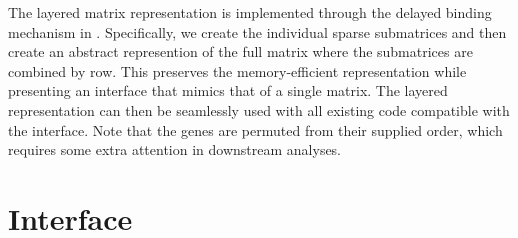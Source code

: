 \documentclass{article}
\begin{document}
The layered matrix representation is implemented through the delayed binding mechanism in .
Specifically, we create the individual sparse submatrices and then create an abstract represention of the full matrix where the submatrices are combined by row.
This preserves the memory-efficient representation while presenting an interface that mimics that of a single matrix.
The layered representation can then be seamlessly used with all existing code compatible with the  interface.
Note that the genes are permuted from their supplied order, which requires some extra attention in downstream analyses.


\section{Interface }



\end{document}
